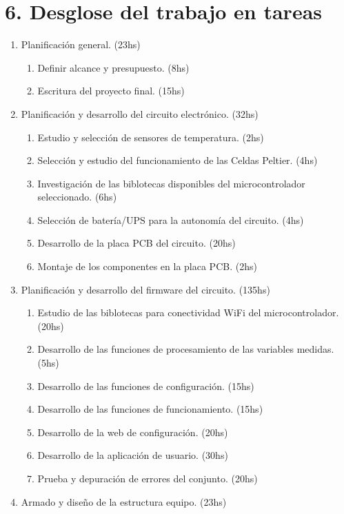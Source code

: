 \section{6. Desglose del trabajo en tareas}
\label{sec:wbs}


\begin{enumerate}
  \item Planificación general. (23hs)
  \begin{enumerate}
  	  \item Definir alcance y presupuesto. (8hs)
      \item Escritura del proyecto final. (15hs) 
  \end{enumerate}
  \item Planificación y desarrollo del circuito electrónico. (32hs)
  \begin{enumerate}
  	  \item Estudio y selección de sensores de temperatura. (2hs)
      \item Selección y estudio del funcionamiento de las Celdas Peltier. (4hs)
      \item Investigación de las biblotecas disponibles del microcontrolador seleccionado. (6hs)
      \item Selección de batería/UPS para la autonomía del circuito. (4hs)
      \item Desarrollo de la placa PCB del circuito. (20hs)
      \item Montaje de los componentes en la placa PCB. (2hs)
  \end{enumerate}
  \item Planificación y desarrollo del firmware del circuito. (135hs)
  \begin{enumerate}
  	  \item Estudio de las biblotecas para conectividad WiFi del microcontrolador. (20hs)
      \item Desarrollo de las funciones de procesamiento de las variables medidas. (5hs)
      \item Desarrollo de las funciones de configuración. (15hs)
      \item Desarrollo de las funciones de funcionamiento. (15hs)
      \item Desarrollo de la web de configuración. (20hs)
      \item Desarrollo de la aplicación de usuario. (30hs)
      \item Prueba y depuración de errores del conjunto. (20hs)
  \end{enumerate}
  \item Armado y diseño de la estructura equipo. (23hs)

\end{enumerate}
